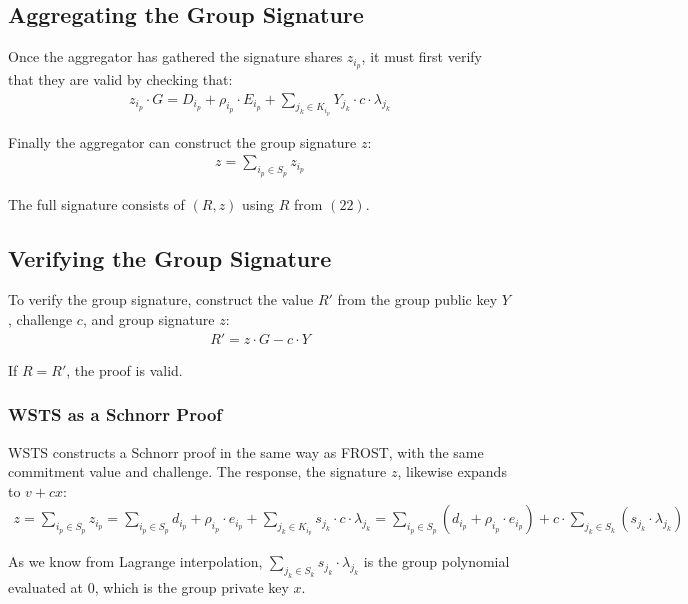 \documentclass{article}
\begin{document}
\subsection{
  Aggregating the Group Signature
}

Once the aggregator has gathered the signature shares $z_{i_p}$, it must first verify that they are valid by checking that:
\begin{align}
  z_{i_p} \cdot G = D_{i_p} + \rho_{i_p} \cdot E_{i_p} + \sum_{j_k \in K_{i_p}}^{} Y_{j_k} \cdot c \cdot \lambda_{j_k}
\end{align}

Finally the aggregator can construct the group signature $z$:
\begin{align}
  z = \sum_{i_p \in S_p}^{} z_{i_p}
\end{align}

The full signature consists of $(R, z)$ using $R$ from $(22)$.

\subsection{
  Verifying the Group Signature
}

To verify the group signature, construct the value $R'$ from the group public key $Y$, challenge $c$, and group signature $z$:
\begin{align}
  R' = z \cdot G - c \cdot Y
\end{align}

If $R = R'$, the proof is valid.

\subsubsection{
  WSTS as a Schnorr Proof
}

WSTS constructs a Schnorr proof in the same way as FROST, with the same commitment value and challenge.  The response, the signature $z$, likewise expands to $v + cx$:
\begin{align}
  z = \sum_{i_p \in S_p}^{} z_{i_p} = \sum_{i_p \in S_p}^{} d_{i_p} + \rho_{i_p} \cdot e_{i_p} + \sum_{j_k \in K_{i_p}}^{} s_{j_k} \cdot c \cdot \lambda_{j_k} = \sum_{i_p \in S_p}^{} (d_{i_p} + \rho_{i_p} \cdot e_{i_p}) + c \cdot \sum_{j_k \in S_k}^{} (s_{j_k} \cdot \lambda_{j_k})\nonumber
\end{align}

As we know from Lagrange interpolation, $\sum_{j_k \in S_k}^{} s_{j_k} \cdot \lambda_{j_k}$ is the group polynomial evaluated at $0$, which is the group private key $x$.
\end{document}
